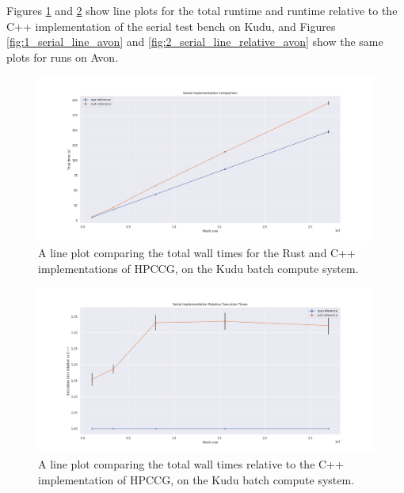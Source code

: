 Figures \ref{fig:1_serial_line} and \ref{fig:2_serial_line_relative} show line plots for the total runtime and runtime relative to the C++ implementation of the serial test bench on Kudu, and Figures \ref{fig:1_serial_line_avon} and \ref{fig:2_serial_line_relative_avon} show the same plots for runs on Avon.

\begin{figure}[H]
    \centering
    \includegraphics[width=\textwidth]{images/5_performance/parallelism/1_serial_line.png}
    \caption{A line plot comparing the total wall times for the Rust and C++ implementations of HPCCG, on the Kudu batch compute system.}
    \label{fig:1_serial_line}
\end{figure}

\begin{figure}[H]
    \centering
    \includegraphics[width=\textwidth]{images/5_performance/parallelism/2_serial_line_relative.png}
    \caption{A line plot comparing the total wall times relative to the C++ implementation of HPCCG, on the Kudu batch compute system.}
    \label{fig:2_serial_line_relative}
\end{figure}

